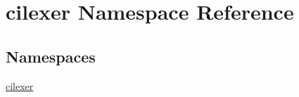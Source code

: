 \hypertarget{namespacecilexer}{}\section{cilexer Namespace Reference}
\label{namespacecilexer}
\subsection*{Namespaces}
\begin{DoxyCompactItemize}
\item 
 \hyperlink{namespacecilexer_1_1cilexer}{cilexer}
\end{DoxyCompactItemize}
